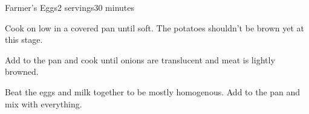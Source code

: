 \documentclass[../Cookbook.tex]{subfiles}
\begin{document}
\begin{recipe}{Farmer's Eggs}{2 servings}{30 minutes}

Cook on low in a covered pan until soft. The potatoes shouldn't be brown yet at this stage.

Add to the pan and cook until onions are translucent and meat is lightly browned.

Beat the eggs and milk together to be mostly homogenous. Add to the pan and mix with everything.

\end{recipe}
\end{document}
